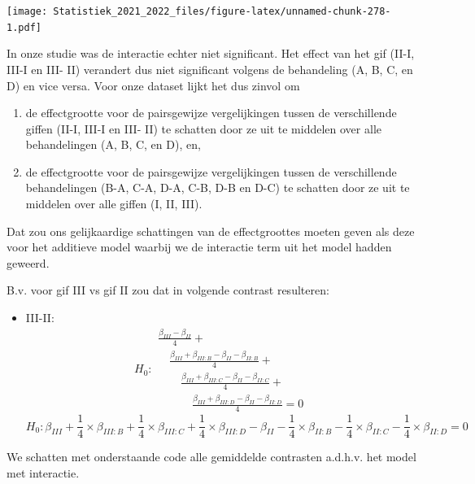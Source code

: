 \documentclass[
  12pt,dutch,coursenotes]{book}
\providecommand{\tightlist}{%
  \setlength{\itemsep}{0pt}\setlength{\parskip}{0pt}}
\theoremstyle{definition}
\theoremstyle{definition}
\theoremstyle{definition}
\theoremstyle{definition}
\theoremstyle{remark}
\begin{document}
\texttt{[image: Statistiek\_2021\_2022\_files/figure-latex/unnamed-chunk-278-1.pdf]}

In onze studie was de interactie echter niet significant. Het effect van het gif (II-I, III-I en III- II) verandert dus niet significant volgens de behandeling (A, B, C, en D) en vice versa. Voor onze dataset lijkt het dus zinvol om

\begin{enumerate}
\def\labelenumi{\arabic{enumi}.}
\tightlist
\item
  de effectgrootte voor de pairsgewijze vergelijkingen tussen de verschillende giffen (II-I, III-I en III- II) te schatten door ze uit te middelen over alle behandelingen (A, B, C, en D), en,
\item
  de effectgrootte voor de pairsgewijze vergelijkingen tussen de verschillende behandelingen (B-A, C-A, D-A, C-B, D-B en D-C) te schatten door ze uit te middelen over alle giffen (I, II, III).
\end{enumerate}

Dat zou ons gelijkaardige schattingen van de effectgroottes moeten geven als deze voor het additieve model waarbij we de interactie term uit het model hadden geweerd.

B.v. voor gif III vs gif II zou dat in volgende contrast resulteren:

\begin{itemize}
\tightlist
\item
  III-II:
  \[H_0: 
  \begin{array}{l}
  \frac{\beta_{III}-\beta_{II}}{4} + \\
  \quad \frac{\beta_{III} + \beta_{III:B}-\beta_{II} - \beta_{II:B}}{4} + \\
  \quad \quad \frac{\beta_{III} + \beta_{III:C}-\beta_{II} - \beta_{II:C}}{4} + \\
  \quad \quad \quad \frac{\beta_{III} + \beta_{III:D}-\beta_{II} - \beta_{II:D}}{4}=0
  \end{array}
  \]
  \[
  H_0:\beta_{III} + \frac{1}{4} \times \beta_{III:B} +  \frac{1}{4} \times\beta_{III:C} +  \frac{1}{4} \times\beta_{III:D}
  -\beta_{II} - \frac{1}{4} \times\beta_{II:B} -  \frac{1}{4} \times\beta_{II:C}  - \frac{1}{4} \times\beta_{II:D}=0
  \]
\end{itemize}

We schatten met onderstaande code alle gemiddelde contrasten a.d.h.v. het model met interactie.
\end{document}
